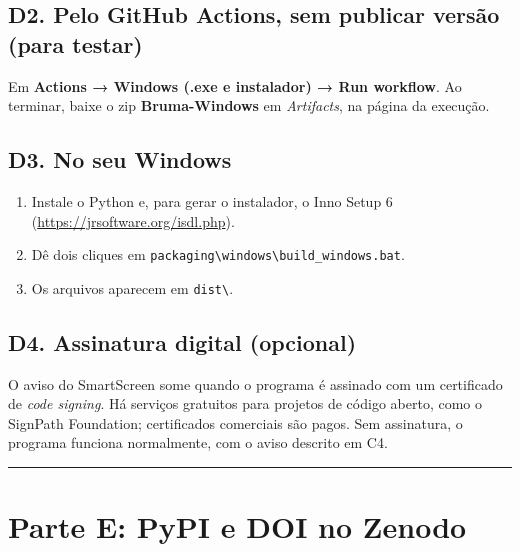 \documentclass[
  10pt,
]{article}
\providecommand{\tightlist}{%
  \setlength{\itemsep}{0pt}\setlength{\parskip}{0pt}}
\begin{document}
\hypertarget{d2.-pelo-github-actions-sem-publicar-versuxe3o-para-testar}{%
\subsection{D2. Pelo GitHub Actions, sem publicar versão (para
testar)}\label{d2.-pelo-github-actions-sem-publicar-versuxe3o-para-testar}}

Em \textbf{Actions → Windows (.exe e instalador) → Run workflow}. Ao
terminar, baixe o zip \textbf{Bruma-Windows} em \emph{Artifacts}, na
página da execução.

\hypertarget{d3.-no-seu-windows}{%
\subsection{D3. No seu Windows}\label{d3.-no-seu-windows}}

\begin{enumerate}
\def\labelenumi{\arabic{enumi}.}
\tightlist
\item
  Instale o Python e, para gerar o instalador, o Inno Setup 6
  (\url{https://jrsoftware.org/isdl.php}).
\item
  Dê dois cliques em
  \texttt{packaging\textbackslash\allowbreak{}windows\textbackslash\allowbreak{}build\_\allowbreak{}windows.\allowbreak{}bat}.
\item
  Os arquivos aparecem em \texttt{dist\textbackslash\allowbreak{}}.
\end{enumerate}

\hypertarget{d4.-assinatura-digital-opcional}{%
\subsection{D4. Assinatura digital
(opcional)}\label{d4.-assinatura-digital-opcional}}

O aviso do SmartScreen some quando o programa é assinado com um
certificado de \emph{code signing}. Há serviços gratuitos para projetos
de código aberto, como o SignPath Foundation; certificados comerciais
são pagos. Sem assinatura, o programa funciona normalmente, com o aviso
descrito em C4.

\begin{center}\rule{0.5\linewidth}{0.5pt}\end{center}

\hypertarget{parte-e-pypi-e-doi-no-zenodo}{%
\section{Parte E: PyPI e DOI no
Zenodo}\label{parte-e-pypi-e-doi-no-zenodo}}
\end{document}
